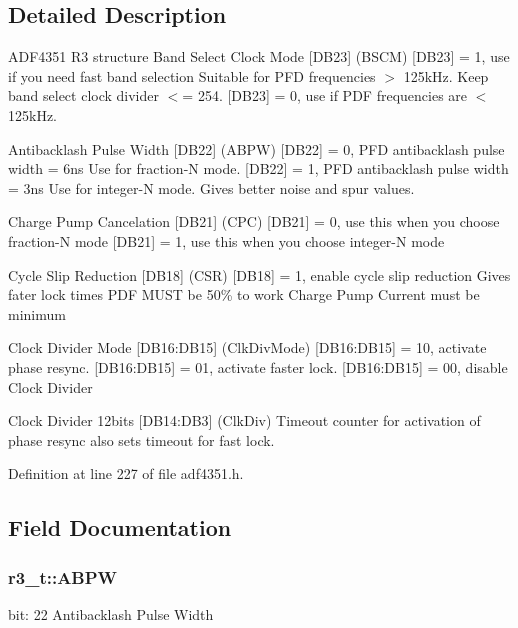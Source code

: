 \subsection{Detailed Description}
A\+D\+F4351 R3 structure Band Select Clock Mode \mbox{[}D\+B23\mbox{]} (B\+S\+CM) \mbox{[}D\+B23\mbox{]} = 1, use if you need fast band selection Suitable for P\+FD frequencies $>$ 125k\+Hz. Keep band select clock divider $<$= 254. \mbox{[}D\+B23\mbox{]} = 0, use if P\+DF frequencies are $<$ 125k\+Hz. 

Antibacklash Pulse Width \mbox{[}D\+B22\mbox{]} (A\+B\+PW) \mbox{[}D\+B22\mbox{]} = 0, P\+FD antibacklash pulse width = 6ns Use for fraction-\/N mode. \mbox{[}D\+B22\mbox{]} = 1, P\+FD antibacklash pulse width = 3ns Use for integer-\/N mode. Gives better noise and spur values.

Charge Pump Cancelation \mbox{[}D\+B21\mbox{]} (C\+PC) \mbox{[}D\+B21\mbox{]} = 0, use this when you choose fraction-\/N mode \mbox{[}D\+B21\mbox{]} = 1, use this when you choose integer-\/N mode

Cycle Slip Reduction \mbox{[}D\+B18\mbox{]} (C\+SR) \mbox{[}D\+B18\mbox{]} = 1, enable cycle slip reduction Gives fater lock times P\+DF M\+U\+ST be 50\% to work Charge Pump Current must be minimum

Clock Divider Mode \mbox{[}D\+B16\+:D\+B15\mbox{]} (Clk\+Div\+Mode) \mbox{[}D\+B16\+:D\+B15\mbox{]} = 10, activate phase resync. \mbox{[}D\+B16\+:D\+B15\mbox{]} = 01, activate faster lock. \mbox{[}D\+B16\+:D\+B15\mbox{]} = 00, disable Clock Divider

Clock Divider 12bits \mbox{[}D\+B14\+:D\+B3\mbox{]} (Clk\+Div) Timeout counter for activation of phase resync also sets timeout for fast lock. 

Definition at line 227 of file adf4351.\+h.



\subsection{Field Documentation}
\subsubsection[{\texorpdfstring{A\+B\+PW}{ABPW}}]{ r3\+\_\+t\+::\+A\+B\+PW}\hypertarget{structr3__t_a5f81f8e2e2dedd4c4b7d939e51ae2c4c}{}\label{structr3__t_a5f81f8e2e2dedd4c4b7d939e51ae2c4c}
bit\+: 22 Antibacklash Pulse Width 


